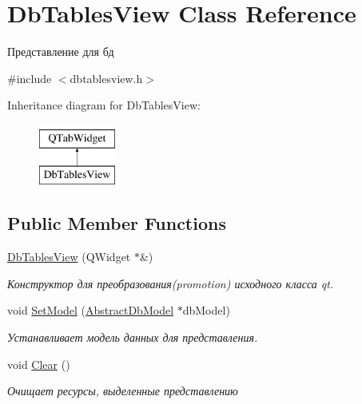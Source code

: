 \hypertarget{class_db_tables_view}{}\section{Db\+Tables\+View Class Reference}
\label{class_db_tables_view}


Представление для бд  




{\ttfamily \#include $<$dbtablesview.\+h$>$}

Inheritance diagram for Db\+Tables\+View\+:\begin{figure}[H]
\begin{center}
\leavevmode
\includegraphics[height=2.000000cm]{class_db_tables_view}
\end{center}
\end{figure}
\subsection*{Public Member Functions}
\begin{DoxyCompactItemize}
\item 
\hyperlink{class_db_tables_view_a822d3b44cd293111709021a5f6d6799d}{Db\+Tables\+View} (Q\+Widget $\ast$\&)
\begin{DoxyCompactList}\small\item\em Конструктор для преобразования(promotion) исходного класса qt. \end{DoxyCompactList}\item 
void \hyperlink{class_db_tables_view_a638f1465c40d9587c4146388dfee063b}{Set\+Model} (\hyperlink{class_abstract_db_model}{Abstract\+Db\+Model} $\ast$db\+Model)
\begin{DoxyCompactList}\small\item\em Устанавливает модель данных для представления. \end{DoxyCompactList}\item 
\mbox{\label{class_db_tables_view_accf2ebff029e84812e48ca6564b392ef}} 
void \hyperlink{class_db_tables_view_accf2ebff029e84812e48ca6564b392ef}{Clear} ()
\begin{DoxyCompactList}\small\item\em Очищает ресурсы, выделенные представлению \end{DoxyCompactList}\end{DoxyCompactItemize}


